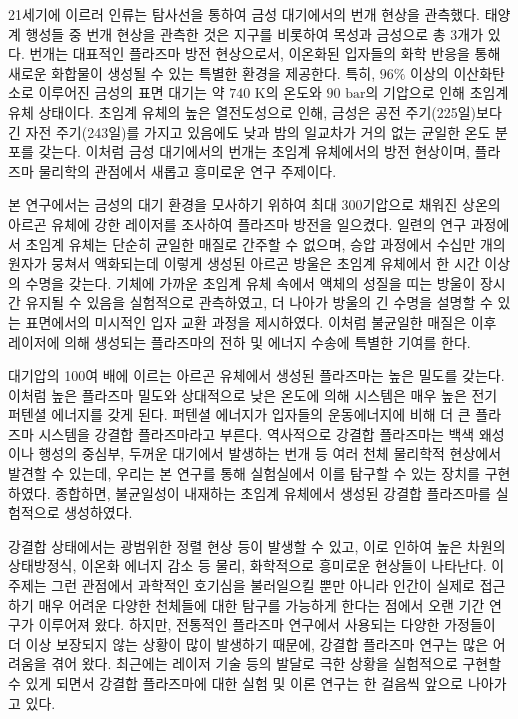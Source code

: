 
21세기에 이르러 인류는 탐사선을 통하여 금성 대기에서의 번개 현상을 관측했다. 태양계 행성들 중 번개 현상을 관측한 것은 지구를 비롯하여 목성과 금성으로 총 3개가 있다. 번개는 대표적인 플라즈마 방전 현상으로서, 이온화된 입자들의 화학 반응을 통해 새로운 화합물이 생성될 수 있는 특별한 환경을 제공한다. 특히, $96\%$ 이상의 이산화탄소로 이루어진 금성의 표면 대기는 약 $740 \text{ K}$의 온도와 $90 \text{ bar}$의 기압으로 인해 초임계 유체 상태이다. 초임계 유체의 높은 열전도성으로 인해, 금성은 공전 주기(225일)보다 긴 자전 주기(243일)를 가지고 있음에도 낮과 밤의 일교차가 거의 없는 균일한 온도 분포를 갖는다. 이처럼 금성 대기에서의 번개는 초임계 유체에서의 방전 현상이며, 플라즈마 물리학의 관점에서 새롭고 흥미로운 연구 주제이다.

본 연구에서는 금성의 대기 환경을 모사하기 위하여 최대 300기압으로 채워진 상온의 아르곤 유체에 강한 레이저를 조사하여 플라즈마 방전을 일으켰다. 일련의 연구 과정에서 초임계 유체는 단순히 균일한 매질로 간주할 수 없으며, 승압 과정에서 수십만 개의 원자가 뭉쳐서 액화되는데 이렇게 생성된 아르곤 방울은 초임계 유체에서 한 시간 이상의 수명을 갖는다. 기체에 가까운 초임계 유체 속에서 액체의 성질을 띠는 방울이 장시간 유지될 수 있음을 실험적으로 관측하였고, 더 나아가 방울의 긴 수명을 설명할 수 있는 표면에서의 미시적인 입자 교환 과정을 제시하였다. 이처럼 불균일한 매질은 이후 레이저에 의해 생성되는 플라즈마의 전하 및 에너지 수송에 특별한 기여를 한다.

대기압의 100여 배에 이르는 아르곤 유체에서 생성된 플라즈마는 높은 밀도를 갖는다. 이처럼 높은 플라즈마 밀도와 상대적으로 낮은 온도에 의해 시스템은 매우 높은 전기 퍼텐셜 에너지를 갖게 된다. 퍼텐셜 에너지가 입자들의 운동에너지에 비해 더 큰 플라즈마 시스템을 강결합 플라즈마라고 부른다. 역사적으로 강결합 플라즈마는 백색 왜성이나 행성의 중심부, 두꺼운 대기에서 발생하는 번개 등 여러 천체 물리학적 현상에서 발견할 수 있는데, 우리는 본 연구를 통해 실험실에서 이를 탐구할 수 있는 장치를 구현하였다. 종합하면, 불균일성이 내재하는 초임계 유체에서 생성된 강결합 플라즈마를 실험적으로 생성하였다.

강결합 상태에서는 광범위한 정렬 현상 등이 발생할 수 있고, 이로 인하여 높은 차원의 상태방정식, 이온화 에너지 감소 등 물리, 화학적으로 흥미로운 현상들이 나타난다. 이 주제는 그런 관점에서 과학적인 호기심을 불러일으킬 뿐만 아니라 인간이 실제로 접근하기 매우 어려운 다양한 천체들에 대한 탐구를 가능하게 한다는 점에서 오랜 기간 연구가 이루어져 왔다. 하지만, 전통적인 플라즈마 연구에서 사용되는 다양한 가정들이 더 이상 보장되지 않는 상황이 많이 발생하기 때문에, 강결합 플라즈마 연구는 많은 어려움을 겪어 왔다. 최근에는 레이저 기술 등의 발달로 극한 상황을 실험적으로 구현할 수 있게 되면서 강결합 플라즈마에 대한 실험 및 이론 연구는 한 걸음씩 앞으로 나아가고 있다.


